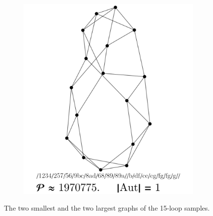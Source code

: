 \documentclass[12pt,a4paper]{article}
\renewcommand{\|}{\rule[-0.4ex]{0.2ex}{1.2em}}
\begin{document}
\begin{figure}[htb]
\begin{subfigure}[b]{.24 \textwidth}
		\subcaption{}
	\end{subfigure}
	\begin{subfigure}[b]{.24 \textwidth}
		\includegraphics[width=\linewidth]{largest_15_1}
		\subcaption{}
	\end{subfigure}
	
	\caption{The two smallest and the two largest graphs of the 15-loop samples.}
	\label{smallest_15}
\end{figure}
\end{document}
